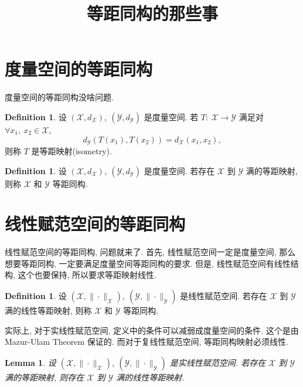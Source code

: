 \documentclass[a4paper,11pt]{article}
\title{等距同构的那些事}
\newtheorem{lemma}[theorem]{Lemma}
\theoremstyle{definition}
\newtheorem{definition}[theorem]{Definition}
\begin{document}
\maketitle

\section{度量空间的等距同构}

度量空间的等距同构没啥问题.

\begin{definition}
    设 $ (\mathscr{X}, d_{\mathscr{X}}),\ (\mathscr{Y}, d_{\mathscr{Y}}) $ 是度量空间.
    若 $ T :\ \mathscr{X} \to \mathscr{Y} $ 满足对 $ \forall x_1,\ x_2 \in \mathscr{X} $,
    $$
        d_{\mathscr{Y}} (T(x_1), T(x_2)) = d_{\mathscr{X}} (x_1, x_2),
    $$
    则称 $ T $ 是等距映射(isometry).
\end{definition}

\begin{definition}
    设 $ (\mathscr{X}, d_{\mathscr{X}}),\ (\mathscr{Y}, d_{\mathscr{Y}}) $ 是度量空间.
    若存在 $ \mathscr{X} $ 到 $ \mathscr{Y} $ 满的等距映射, 则称 $ \mathscr{X} $ 和 $ \mathscr{Y} $ 等距同构.
\end{definition}

\section{线性赋范空间的等距同构}

线性赋范空间的等距同构, 问题就来了. 首先, 线性赋范空间一定是度量空间, 
那么想要等距同构, 一定要满足度量空间等距同构的要求.
但是, 线性赋范空间有线性结构, 这个也要保持, 所以要求等距映射线性.

\begin{definition}
    设 $ (\mathscr{X}, \| \cdot \|_\mathscr{X}),\ (\mathscr{Y}, \| \cdot \|_\mathscr{Y}) $ 是线性赋范空间.
    若存在 $ \mathscr{X} $ 到 $ \mathscr{Y} $ 满的线性等距映射, 则称 $ \mathscr{X} $ 和 $ \mathscr{Y} $ 等距同构.
\end{definition}

实际上, 对于实线性赋范空间, 定义中的条件可以减弱成度量空间的条件.
这个是由 Mazur-Ulam Theorem 保证的. 而对于复线性赋范空间, 等距同构映射必须线性.

\begin{lemma}  \label{1}
    设 $ (\mathscr{X}, \| \cdot \|_\mathscr{X}),\ (\mathscr{Y}, \| \cdot \|_\mathscr{Y}) $ 是实线性赋范空间.
    若存在 $ \mathscr{X} $ 到 $ \mathscr{Y} $ 满的等距映射, 则存在 $ \mathscr{X} $ 到 $ \mathscr{Y} $ 满的线性等距映射.
\end{lemma}
\end{document}
